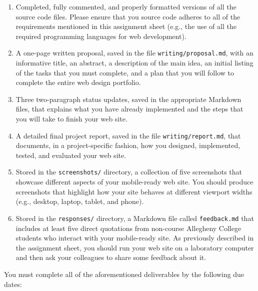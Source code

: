 \documentclass[11pt]{article}
\newcommand{\program}[1]{\lstinline{#1}}
\begin{document}
\begin{enumerate}

  \setlength{\itemsep}{0in}

\item Completed, fully commented, and properly formatted versions of all the
  source code files. Please ensure that you source code adheres to all of the
  requirements mentioned in this assignment sheet (e.g., the use of all the
  required programming languages for web development).

\item A one-page written proposal, saved in the file
  \program{writing/proposal.md}, with an informative title, an abstract, a
  description of the main idea, an initial listing of the tasks that you must
  complete, and a plan that you will follow to complete the entire web design
  portfolio.

\item Three two-paragraph status updates, saved in the appropriate Markdown
  files, that explains what you have already implemented and the steps that you
  will take to finish your web site.

\item A detailed final project report, saved in the file
  \program{writing/report.md}, that documents, in a project-specific fashion,
  how you designed, implemented, tested, and evaluated your web site.

\item Stored in the \program{screenshots/} directory, a collection of five
  screenshots that showcase different aspects of your mobile-ready web site. You
  should produce screenshots that highlight how your site behaves at different
  viewport widths (e.g., desktop, laptop, tablet, and phone).

\item Stored in the \program{responses/} directory, a Markdown file called
  \program{feedback.md} that includes at least five direct quotations from
  non-course Allegheny College students who interact with your mobile-ready
  site. As previously described in the assignment sheet, you should run your web
  site on a laboratory computer and then ask your colleagues to share some
  feedback about it.

\end{enumerate}

\vspace*{-.1in}

\noindent You must complete all of the aforementioned deliverables by the
following due dates:
\end{document}

